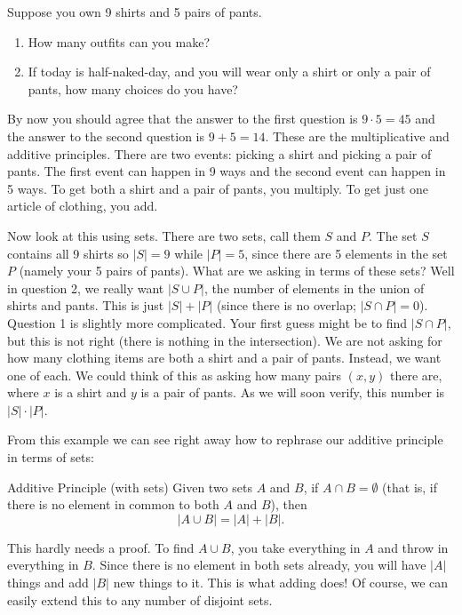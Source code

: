 \documentclass[12pt]{article}
\begin{document}
\begin{example}
 Suppose you own 9 shirts and 5 pairs of pants.
 \begin{enumerate}
  \item How many outfits can you make?
  \item If today is half-naked-day, and you will wear only a shirt or only a pair of pants, how many choices do you have?
 \end{enumerate}
\begin{solution}
 By now you should agree that the answer to the first question is $9 \cdot 5 = 45$ and the answer to the second question is $9 + 5 = 14$.  These are the multiplicative and additive principles.  There are two events: picking a shirt and picking a pair of pants.  The first event can happen in 9 ways and the second event can happen in 5 ways.  To get both a shirt and a pair of pants, you multiply.  To get just one article of clothing, you add.

 Now look at this using sets.  There are two sets, call them $S$ and $P$.  The set $S$ contains all 9 shirts so $|S| = 9$ while $|P| = 5$, since there are 5 elements in the set $P$ (namely your 5 pairs of pants).  What are we asking in terms of these sets?  Well in question 2, we really want $|S \cup P|$, the number of elements in the union of shirts and pants.  This is just $|S| + |P|$ (since there is no overlap; $|S \cap P| = 0$).  Question 1 is slightly more complicated.  Your first guess might be to find $|S \cap P|$, but this is not right (there is nothing in the intersection).  We are not asking for how many clothing items are both a shirt and a pair of pants.  Instead, we want one of each.  We could think of this as asking how many pairs $(x,y)$ there are, where $x$ is a shirt and $y$ is a pair of pants.  As we will soon verify, this number is $|S| \cdot |P|$.
\end{solution}
\end{example}

From this example we can see right away how to rephrase our additive principle in terms of sets:

\begin{defbox}{Additive Principle (with sets)}
Given two sets $A$ and $B$, if $A \cap B = \emptyset$ (that is, if there is no element in common to both $A$ and $B$), then
\[|A \cup B| = |A| + |B|.\]
\end{defbox}

This hardly needs a proof.  To find $A \cup B$, you take everything in $A$ and throw in everything in $B$.  Since there is no element in both sets already, you will have $|A|$ things and add $|B|$ new things to it.  This is what adding does!  Of course, we can easily extend this to any number of disjoint sets.
\end{document}
